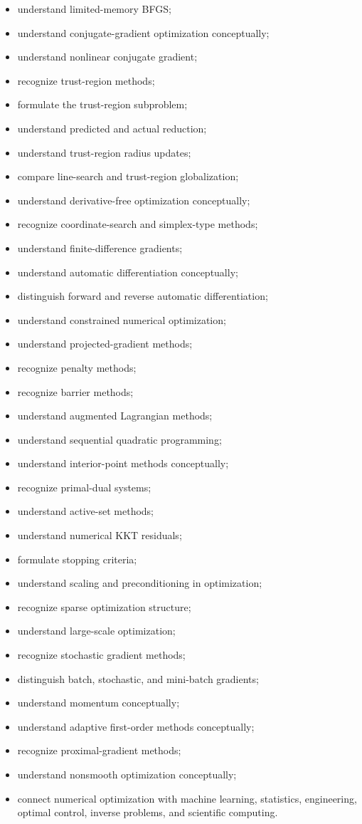 {\begin{itemize}
    \item understand limited-memory BFGS;
    \item understand conjugate-gradient optimization conceptually;
    \item understand nonlinear conjugate gradient;
    \item recognize trust-region methods;
    \item formulate the trust-region subproblem;
    \item understand predicted and actual reduction;
    \item understand trust-region radius updates;
    \item compare line-search and trust-region globalization;
    \item understand derivative-free optimization conceptually;
    \item recognize coordinate-search and simplex-type methods;
    \item understand finite-difference gradients;
    \item understand automatic differentiation conceptually;
    \item distinguish forward and reverse automatic differentiation;
    \item understand constrained numerical optimization;
    \item understand projected-gradient methods;
    \item recognize penalty methods;
    \item recognize barrier methods;
    \item understand augmented Lagrangian methods;
    \item understand sequential quadratic programming;
    \item understand interior-point methods conceptually;
    \item recognize primal-dual systems;
    \item understand active-set methods;
    \item understand numerical KKT residuals;
    \item formulate stopping criteria;
    \item understand scaling and preconditioning in optimization;
    \item recognize sparse optimization structure;
    \item understand large-scale optimization;
    \item recognize stochastic gradient methods;
    \item distinguish batch, stochastic, and mini-batch gradients;
    \item understand momentum conceptually;
    \item understand adaptive first-order methods conceptually;
    \item recognize proximal-gradient methods;
    \item understand nonsmooth optimization conceptually;
    \item connect numerical optimization with machine learning, statistics,
          engineering, optimal control, inverse problems, and scientific
          computing.
\end{itemize}
}

